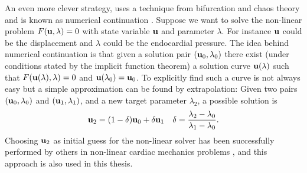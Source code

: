 An even more clever strategy, uses a technique from bifurcation and
chaos theory and is known as numerical continuation
\cite{allgower2003introduction}.  Suppose we want to
solve the non-linear problem $F(\mathbf{u}, \lambda)=0$ with state variable
$\mathbf{u}$ and parameter $\lambda$. For instance $\mathbf{u}$ could be the
displacement and $\lambda$ could be the endocardial pressure.
The idea behind numerical continuation is that given a solution pair
$(\mathbf{u}_0, \lambda_0)$ there exist (under conditions stated by the
implicit function theorem) a solution curve $\mathbf{u}(\lambda)$ such that
$F(\mathbf{u}(\lambda), \lambda)=0$ and $\mathbf{u}(\lambda_0) = \mathbf{u}_0$.
To explicitly find such a curve is not always easy but a simple
approximation can be found by extrapolation: Given two pairs
$(\mathbf{u}_0, \lambda_0)$ and $(\mathbf{u}_1, \lambda_1)$, and a new target
parameter $\lambda_2$, a possible solution is 
\begin{align}
  \mathbf{u}_2 =  (1-\delta)\mathbf{u}_0 + \delta \mathbf{u}_1 && \delta = \frac{\lambda_2 - \lambda_0}{\lambda_1 - \lambda_0}.
\end{align}
Choosing $\mathbf{u}_2$ as initial guess for the non-linear solver has been
successfully performed by others in non-linear cardiac mechanics
problems \cite{pezzuto2013mechanics}, and this approach is also used
in this thesis. 





